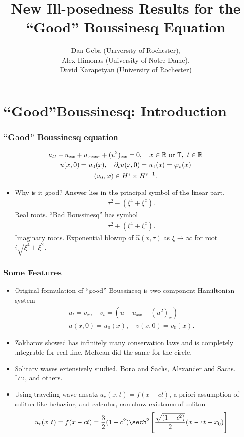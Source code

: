 \documentclass{beamer}
\title[Ill-posedness for Boussinesq]{New Ill-posedness Results for the ``Good'' Boussinesq Equation }
\author[Geba, Himonas, Karapetyan]{Dan Geba (University of Rochester), \\ Alex Himonas (University of Notre Dame), \\ David Karapetyan (University of Rochester)}
\institute[UR, ND]{}
\date{}
\numberwithin{equation*}{section}
\newcommand{\rr}{\mathbb{R}}
\newcommand{\p}{\partial}
\newcommand{\ci}{\mathbb{T}}
\newcommand{\wh}{\widehat}
\newcommand{\vp}{\varphi}
\begin{document}
\begin{frame}
\titlepage
\end{frame}
\section{``Good''Boussinesq: Introduction}
\begin{frame}
  \frametitle{``Good'' Boussinesq equation}
\begin{gather*}
u_{tt} - u_{xx} + u_{xxxx} + (u^2)_{xx} = 0, \quad x \in \rr \ \text{or} \
\ci, \ t \in \rr
\label{eqn:mb-2}
\\
u(x,0) = u_{0}(x), \quad \p_t u(x, 0) = u_{1}(x) = \vp_{x}(x)
\label{eqn:mb-init-data-2}
\\
\notag
(u_0, \vp) \in
H^{s}\times
H^{s-1}.
\end{gather*}
\pause
\begin{itemize}
\item{}
Why is it good? Answer lies in the principal symbol of the linear part.
\begin{gather*}
  \tau^{2} - (\xi^{4} + \xi^{2}).
\end{gather*}
\pause
Real roots. ``Bad Boussinesq'' has symbol
\begin{gather*}
 \tau^{2} + (\xi^{4} + \xi^{2}). 
\end{gather*}
\pause
Imaginary roots. Exponential blowup of $\wh{u}(x, \tau)$ as $\xi \to \infty$ for root $i \sqrt{\xi^{4} + \xi^{2}}$.
\end{itemize}
\end{frame}
\begin{frame}
\frametitle{Some Features}
\begin{itemize}
\item{}
Original formulation of ``good'' Boussinesq is two component Hamiltonian system
\begin{gather*}
  u_{t} = v_{x}, \quad v_{t} = (u - u_{xx} - (u^{2})_{x}),
  \\
  u(x,0) = u_{0}(x), \quad v(x,0) = v_{0}(x).
\end{gather*}
\pause
\item Zakharov showed has infinitely many conservation laws and is completely integrable for real line. McKean did the same for the circle.
\pause
\item{}
Solitary waves extensively studied. Bona and Sachs, Alexander and Sachs, Liu, and others.
\pause
\item{}Using traveling wave ansatz $u_{c}(x,t) = f(x - ct)$, a priori assumption of soliton-like behavior, and calculus, can show existence of soliton
\begin{gather*}
  u_{c}(x,t) = f(x - ct) = \frac{3}{2}(1-c^{2}) \sech^{2} \left
  [\frac{\sqrt{(1-c^{2})}}{2}(x -ct -x_{0})
  \right ]
\end{gather*}
\end{itemize}
\end{frame}
\end{document}

